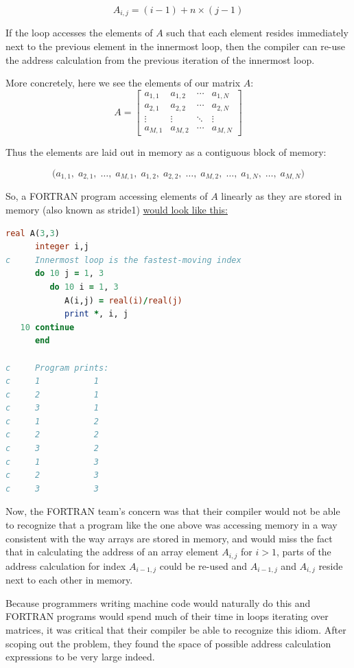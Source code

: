 \[
	A_{i, j} = (i - 1) + n \times (j - 1)
\]

If the loop accesses the elements of $A$ such that each element resides immediately next to the previous
element in the innermost loop, then the compiler can re-use the address calculation from the previous
iteration of the innermost loop.

More concretely, here we see the elements of our matrix $A$:
\[
	A =
	\begin{bmatrix}
		a_{1,1} & a_{1,2} & \cdots & a_{1,N} \\
		a_{2,1} & a_{2,2} & \cdots & a_{2,N} \\
		\vdots  & \vdots  & \ddots & \vdots  \\
		a_{M,1} & a_{M,2} & \cdots & a_{M,N}
	\end{bmatrix}
\]

Thus the elements are laid out in memory as a contiguous block of memory:

\[
	\big(
	a_{1,1},\; a_{2,1},\; \dots,\; a_{M,1},\;
	a_{1,2},\; a_{2,2},\; \dots,\; a_{M,2},\;
	\ldots,\;
	a_{1,N},\; \dots,\; a_{M,N}
	\big)
\]

So, a FORTRAN program accessing elements of $A$ linearly as they
are stored in memory (also known as \gls{stride1})
\href{https://godbolt.org/z/T6M4dvMP4}{would look like this:}

\begin{lstlisting}[language=Fortran,frame=single]
      real A(3,3)
      integer i,j
c     Innermost loop is the fastest-moving index
      do 10 j = 1, 3
         do 10 i = 1, 3
            A(i,j) = real(i)/real(j)
            print *, i, j
   10 continue
      end

c     Program prints:
c     1           1
c     2           1
c     3           1
c     1           2
c     2           2
c     3           2
c     1           3
c     2           3
c     3           3
\end{lstlisting}

Now, the FORTRAN team's concern was that their compiler would not be able to recognize
that a program like the one above was accessing memory in a way consistent with the
way arrays are stored in memory, and would miss the fact that in calculating
the address of an array element $A_{i,j}$ for $i > 1$, parts of the address calculation
for index $A_{i-1, j}$ could be re-used and $A_{i-1, j}$ and $A_{i, j}$ reside
next to each other in memory.

Because programmers writing machine code would naturally do this and FORTRAN
programs would spend much of their time in loops iterating over matrices,
it was critical that their compiler be able to recognize this idiom.
After scoping out the problem, they found the space of possible address calculation
expressions to be very large indeed.

